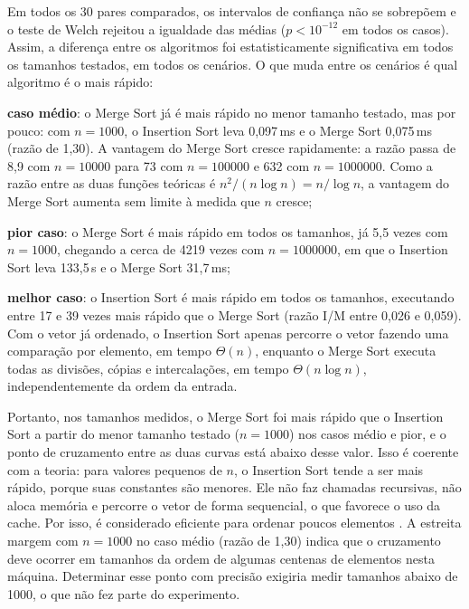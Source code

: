 \documentclass[
    12pt,
    oneside,
    a4paper,
    openany,
    chapter=TITLE,
    english,
    brazil
]{abntex2}
\begin{document}
Em todos os 30 pares comparados, os intervalos de confiança não se sobrepõem e o teste de Welch rejeitou a igualdade das médias ($p < 10^{-12}$ em todos os casos). Assim, a diferença entre os algoritmos foi estatisticamente significativa em todos os tamanhos testados, em todos os cenários. O que muda entre os cenários é qual algoritmo é o mais rápido:

\begin{alineas}
    \item \textbf{caso médio}: o Merge Sort já é mais rápido no menor tamanho testado, mas por pouco: com $n = \num{1000}$, o Insertion Sort leva 0,097\,ms e o Merge Sort 0,075\,ms (razão de 1,30). A vantagem do Merge Sort cresce rapidamente: a razão passa de 8,9 com $n = \num{10000}$ para 73 com $n = \num{100000}$ e 632 com $n = \num{1000000}$. Como a razão entre as duas funções teóricas é $n^2 / (n \log n) = n / \log n$, a vantagem do Merge Sort aumenta sem limite à medida que $n$ cresce;
    \item \textbf{pior caso}: o Merge Sort é mais rápido em todos os tamanhos, já 5,5 vezes com $n = \num{1000}$, chegando a cerca de \num{4219} vezes com $n = \num{1000000}$, em que o Insertion Sort leva 133,5\,s e o Merge Sort 31,7\,ms;
    \item \textbf{melhor caso}: o Insertion Sort é mais rápido em todos os tamanhos, executando entre 17 e 39 vezes mais rápido que o Merge Sort (razão I/M entre 0,026 e 0,059). Com o vetor já ordenado, o Insertion Sort apenas percorre o vetor fazendo uma comparação por elemento, em tempo $\Theta(n)$, enquanto o Merge Sort executa todas as divisões, cópias e intercalações, em tempo $\Theta(n \log n)$, independentemente da ordem da entrada.
\end{alineas}

Portanto, nos tamanhos medidos, o Merge Sort foi mais rápido que o Insertion Sort a partir do menor tamanho testado ($n = \num{1000}$) nos casos médio e pior, e o ponto de cruzamento entre as duas curvas está abaixo desse valor. Isso é coerente com a teoria: para valores pequenos de $n$, o Insertion Sort tende a ser mais rápido, porque suas constantes são menores. Ele não faz chamadas recursivas, não aloca memória e percorre o vetor de forma sequencial, o que favorece o uso da cache. Por isso, é considerado eficiente para ordenar poucos elementos \cite{cormen2012}. A estreita margem com $n = \num{1000}$ no caso médio (razão de 1,30) indica que o cruzamento deve ocorrer em tamanhos da ordem de algumas centenas de elementos nesta máquina. Determinar esse ponto com precisão exigiria medir tamanhos abaixo de \num{1000}, o que não fez parte do experimento.
\end{document}
